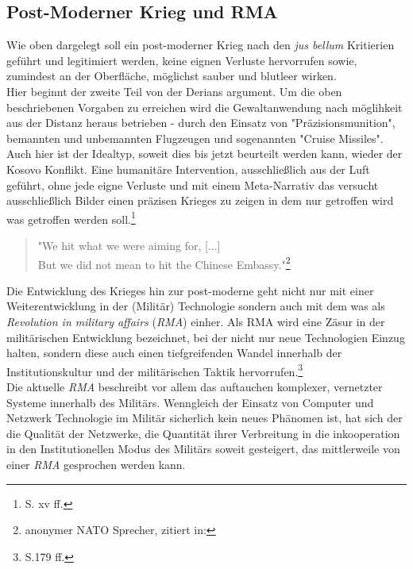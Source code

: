 \documentclass[11pt,a4paper,oneside,numbers=noenddot,bibliography=totocnumbered,DIV=13]{scrartcl}
\begin{document}
\subsection{Post-Moderner Krieg und RMA}
Wie oben dargelegt soll ein post-moderner Krieg nach den \textit{jus bellum} Kritierien geführt und legitimiert werden, keine eignen Verluste hervorrufen sowie, zumindest an der Oberfläche, möglichst sauber und blutleer wirken.\\
Hier beginnt der zweite Teil von der Derians argument. Um die oben beschriebenen Vorgaben zu erreichen wird die Gewaltanwendung nach möglihkeit aus der Distanz heraus betrieben - durch den Einsatz von "Präzisionsmunition", bemannten und unbemannten Flugzeugen und sogenannten "Cruise Missiles". Auch hier ist der Idealtyp, soweit dies bis jetzt beurteilt werden kann, wieder der Kosovo Konflikt. Eine humanitäre Intervention, ausschließlich aus der Luft geführt, ohne jede eigne Verluste und mit einem Meta-Narrativ das versucht ausschließlich Bilder einen präzisen Krieges zu zeigen in dem nur getroffen wird was getroffen werden soll.\footnote{\cite{DerDerian2001} S. xv ff.}
\begin{quote}
"We hit what we were aiming for, [...]\\
 But we did not mean to hit the Chinese Embassy."\footnote{anonymer NATO Sprecher, zitiert in:\cite{gordon_crisis_1999}} 
\end{quote}
Die Entwicklung des Krieges hin zur post-moderne geht nicht nur mit einer Weiterentwicklung in der (Militär) Technologie sondern auch mit dem was als \textit{Revolution in military affairs} (\textit{RMA}) einher. Als RMA wird eine Zäsur in der militärischen Entwicklung bezeichnet, bei der nicht nur neue Technologien Einzug halten, sondern diese auch einen tiefgreifenden Wandel innerhalb der Institutionskultur und der militärischen Taktik hervorrufen.\footnote{\cite{singer_wired_2010} S.179 ff.} \\
Die aktuelle \textit{RMA} beschreibt vor allem das auftauchen komplexer, vernetzter Systeme innerhalb des Militärs. Wenngleich der Einsatz von Computer und Netzwerk Technologie im Militär sicherlich kein neues Phänomen ist, hat sich der die Qualität der Netzwerke, die Quantität ihrer Verbreitung in die inkooperation in den Institutionellen Modus des Militärs soweit gesteigert, das mittlerweile von einer \textit{RMA} gesprochen werden kann.
\end{document}
